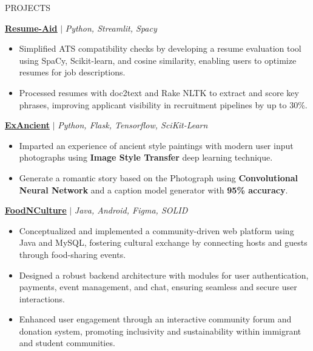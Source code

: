 \documentclass{resume} %
\begin{document}

\begin{rSection}{PROJECTS}
\vspace{0.05em}

\href{https://github.com/RutvikJ77/Resume-aid}{\textbf{\underline{Resume-Aid}}} $|$\textit{ Python, Streamlit, Spacy}
\begin{itemize}
    \item Simplified ATS compatibility checks by developing a resume evaluation tool using SpaCy, Scikit-learn, and cosine similarity, enabling users to optimize resumes for job descriptions.
    \item Processed resumes with doc2text and Rake NLTK to extract and score key phrases, improving applicant visibility in recruitment pipelines by up to 30\%.
\end{itemize}

\break

\href{https://github.com/RutvikJ77/ExAncient}{\textbf{\underline{ExAncient}}} $|$\textit{ Python, Flask, Tensorflow, SciKit-Learn}
\begin{itemize}
    \item {Imparted an experience of ancient style paintings with modern user input photographs using \textbf{Image Style Transfer} deep learning technique.}
    \item {Generate a romantic story based on the Photograph using \textbf{Convolutional Neural Network} and a caption model generator with \textbf{95\% accuracy}.}
\end{itemize}

\href{https://github.com/RutvikJ77/FoodNCulture}{\textbf{\underline{FoodNCulture}}} $|$\textit{ Java, Android, Figma, SOLID}
\begin{itemize}
  \item Conceptualized and implemented a community-driven web platform using Java and MySQL, fostering cultural exchange by connecting hosts and guests through food-sharing events.
  \item Designed a robust backend architecture with modules for user authentication, payments, event management, and chat, ensuring seamless and secure user interactions.
  \item Enhanced user engagement through an interactive community forum and donation system, promoting inclusivity and sustainability within immigrant and student communities.
\end{itemize}


\end{rSection}
\end{document}
